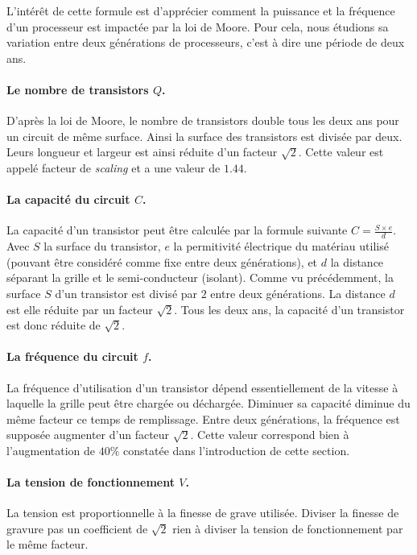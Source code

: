 L'intérêt de cette formule est d'apprécier comment la puissance et la fréquence d'un processeur est impactée par la loi de Moore. Pour cela, nous étudions sa variation entre deux générations de processeurs, c'est à dire une période de deux ans.

\paragraph{Le nombre de transistors $Q$.} D'après la loi de Moore, le nombre de transistors double tous les deux ans pour un circuit de même surface. Ainsi la surface des transistors est divisée par deux. Leurs longueur et largeur est ainsi réduite d'un facteur $\sqrt{2}$. Cette valeur est appelé facteur de \textit{scaling} et a une valeur de $1.44$.

\paragraph{La capacité du circuit $C$.} La capacité d'un transistor peut être calculée par la formule suivante $C = \frac{S \times e}{d}$. Avec $S$ la surface du transistor, $e$ la permitivité électrique du matériau utilisé (pouvant être considéré comme fixe entre deux générations), et $d$ la distance séparant la grille et le semi-conducteur (isolant). Comme vu précédemment, la surface $S$ d'un transistor est divisé par $2$ entre deux générations. La distance $d$ est elle réduite par un facteur $\sqrt{2}$. Tous les deux ans, la capacité d'un transistor est donc réduite de $\sqrt{2}$. 

\paragraph{La fréquence du circuit $f$.} La fréquence d'utilisation d'un transistor dépend essentiellement de la vitesse à laquelle la grille peut être chargée ou déchargée. Diminuer sa capacité diminue du même facteur ce temps de remplissage. Entre deux générations, la fréquence est supposée augmenter d'un facteur $\sqrt{2}$. Cette valeur correspond bien à l'augmentation de $40\%$ constatée dans l'introduction de cette section. 

\paragraph{La tension de fonctionnement $V$.} La tension est proportionnelle à la finesse de grave utilisée. Diviser la finesse de gravure pas un coefficient de $\sqrt{2}$ rien à diviser la tension de fonctionnement par le même facteur. 

